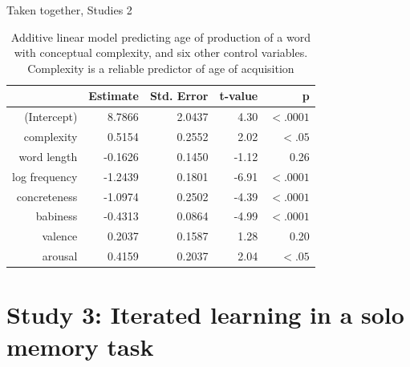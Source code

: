 Taken together, Studies 2 


\begin{table}[t!]
\centering
\begin{tabular}{rrrrr}
  \hline
 & Estimate & Std. Error & t-value & p\\ 
  \hline
(Intercept) & 8.7866 & 2.0437 & 4.30 & $<.0001$ \\ 
  complexity & 0.5154 & 0.2552 & 2.02 & $<.05$ \\ 
  word length & -0.1626 & 0.1450 & -1.12 & 0.26\\ 
  log frequency  & -1.2439 & 0.1801 & -6.91 & $<.0001$ \\ 
  concreteness & -1.0974 & 0.2502 & -4.39 & $<.0001$\\ 
  babiness & -0.4313 & 0.0864 & -4.99 &$<.0001$\\ 
  valence & 0.2037 & 0.1587 & 1.28 & 0.20 \\ 
  arousal & 0.4159 & 0.2037 & 2.04 &$ <.05$ \\ 
   \hline
\end{tabular}
\caption{Additive linear model predicting age of production of a word with conceptual complexity, and six other control variables. Complexity is a reliable predictor of age of acquisition}
  \label{tab:aoapred}
\end{table}




\section{Study 3: Iterated learning in a solo memory task}

